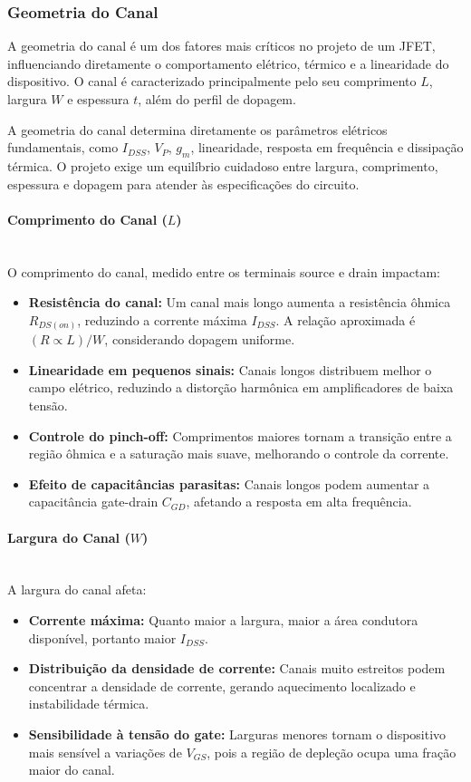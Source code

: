 \documentclass[12pt]{article}
\newcommand{\subsubsubsection}[1]{%
  \paragraph{#1}\mbox{}\\
}
\begin{document}
\subsubsection{Geometria do Canal}

A geometria do canal é um dos fatores mais críticos no projeto de um JFET, influenciando diretamente o comportamento elétrico, térmico e a linearidade do dispositivo. O canal é caracterizado principalmente pelo seu comprimento \(L\), largura \(W\) e espessura \(t\), além do perfil de dopagem.

A geometria do canal determina diretamente os parâmetros elétricos fundamentais, como \(I_{DSS}\), \(V_P\), \(g_m\), linearidade, resposta em frequência e dissipação térmica. O projeto exige um equilíbrio cuidadoso entre largura, comprimento, espessura e dopagem para atender às especificações do circuito.

\subsubsubsection{Comprimento do Canal (\(L\))}

O comprimento do canal, medido entre os terminais source e drain impactam:

\begin{itemize}
    \item \textbf{Resistência do canal:} Um canal mais longo aumenta a resistência ôhmica \(R_{DS(on)}\), reduzindo a corrente máxima \(I_{DSS}\). A relação aproximada é \((R \propto L)/W\), considerando dopagem uniforme.
    
    \item \textbf{Linearidade em pequenos sinais:} Canais longos distribuem melhor o campo elétrico, reduzindo a distorção harmônica em amplificadores de baixa tensão.

    \item \textbf{Controle do pinch-off:} Comprimentos maiores tornam a transição entre a região ôhmica e a saturação mais suave, melhorando o controle da corrente.
    
    \item \textbf{Efeito de capacitâncias parasitas:} Canais longos podem aumentar a capacitância gate-drain \(C_{GD}\), afetando a resposta em alta frequência.
\end{itemize}

\subsubsubsection{Largura do Canal (\(W\))}

A largura do canal afeta:

\begin{itemize}
    \item \textbf{Corrente máxima:} Quanto maior a largura, maior a área condutora disponível, portanto maior \(I_{DSS}\).
    \item \textbf{Distribuição da densidade de corrente:} Canais muito estreitos podem concentrar a densidade de corrente, gerando aquecimento localizado e instabilidade térmica.
    \item \textbf{Sensibilidade à tensão do gate:} Larguras menores tornam o dispositivo mais sensível a variações de \(V_{GS}\), pois a região de depleção ocupa uma fração maior do canal.
\end{itemize}
\end{document}
